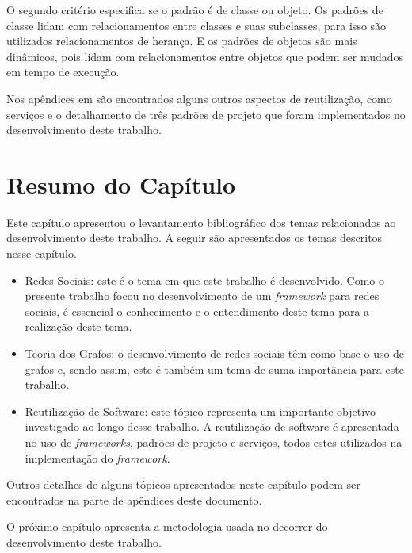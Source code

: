O segundo critério especifica se o padrão é de classe ou objeto. Os padrões de classe lidam com relacionamentos entre classes e suas subclasses, para isso são utilizados relacionamentos de herança. E os padrões de objetos são mais dinâmicos, pois lidam com relacionamentos entre objetos que podem ser mudados em tempo de execução.

Nos apêndices em  são encontrados alguns outros aspectos de reutilização, como serviços e o detalhamento de três padrões de projeto que foram implementados no desenvolvimento deste trabalho.

\section{Resumo do Capítulo}
Este capítulo apresentou o levantamento bibliográfico dos temas relacionados ao desenvolvimento deste trabalho. A seguir são apresentados os temas descritos nesse capítulo.

\begin{itemize}
	\item Redes Sociais: este é o tema em que este trabalho é desenvolvido. Como o presente trabalho focou no desenvolvimento de um \textit{framework} para redes sociais, é essencial o conhecimento e o entendimento deste tema para a realização deste tema.
	\item Teoria dos Grafos: o desenvolvimento de redes sociais têm como base o uso de grafos e, sendo assim, este é também um tema de suma importância para este trabalho.
	\item Reutilização de Software: este tópico representa um importante objetivo investigado ao longo desse trabalho. A reutilização de software é apresentada no uso de \textit{frameworks}, padrões de projeto e serviços, todos estes utilizados na implementação do \textit{framework}.
\end{itemize}

Outros detalhes de alguns tópicos apresentados neste capítulo podem ser encontrados na parte de apêndices deste documento.

O próximo capítulo apresenta a metodologia usada no decorrer do desenvolvimento deste trabalho.
